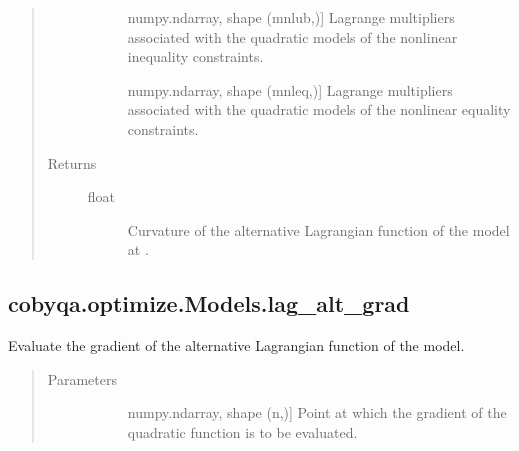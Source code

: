 \documentclass[letterpaper,10pt,english]{sphinxmanual}
\begin{document}
\begin{fulllineitems}
\begin{fulllineitems}
\begin{quote}
\begin{description}
\begin{description}
\item[{}] \leavevmode{[}numpy.ndarray, shape (mnlub,){]}
\sphinxAtStartPar
Lagrange multipliers associated with the quadratic models of the
nonlinear inequality constraints.

\item[{}] \leavevmode{[}numpy.ndarray, shape (mnleq,){]}
\sphinxAtStartPar
Lagrange multipliers associated with the quadratic models of the
nonlinear equality constraints.

\end{description}

\item[{Returns}] \leavevmode\begin{description}
\item[{float}] \leavevmode
\sphinxAtStartPar
Curvature of the alternative Lagrangian function of the model at
.

\end{description}

\end{description}\end{quote}

\end{fulllineitems}



\subsection{cobyqa.optimize.Models.lag\_alt\_grad}
\label{\detokenize{refs/generated/cobyqa.optimize.Models.lag_alt_grad:cobyqa-optimize-models-lag-alt-grad}}\label{\detokenize{refs/generated/cobyqa.optimize.Models.lag_alt_grad::doc}}

\begin{fulllineitems}
\label{\detokenize{refs/generated/cobyqa.optimize.Models.lag_alt_grad:cobyqa.optimize.Models.lag_alt_grad}}
\sphinxAtStartPar
Evaluate the gradient of the alternative Lagrangian function of the
model.
\begin{quote}\begin{description}
\item[{Parameters}] \leavevmode\begin{description}
\item[{}] \leavevmode{[}numpy.ndarray, shape (n,){]}
\sphinxAtStartPar
Point at which the gradient of the quadratic function is to be
evaluated.


\end{description}
\end{description}
\end{quote}
\end{fulllineitems}
\end{fulllineitems}
\end{document}

